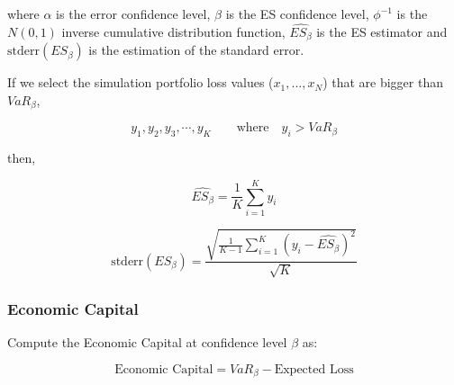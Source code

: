 \documentclass[a4paper,12pt,final]{article}
\begin{document}
where $\alpha$ is the error confidence level, $\beta$ is the ES confidence 
level, $\phi^{-1}$ is the $N(0,1)$ inverse cumulative distribution function, 
$\widehat{ES_{\beta}}$ is the ES estimator and $\textrm{stderr}(ES_{\beta})$
is the estimation of the standard error.
\newline

If we select the simulation portfolio loss values ($x_1, ..., x_N$) that are bigger 
than $VaR_{\beta}$,

\begin{displaymath}
y_1, y_2, y_3, \cdots, y_K \qquad \textrm{where} \quad y_i > VaR_{\beta}
\end{displaymath}

then,

\begin{displaymath}
\widehat{ES_{\beta}} = \frac{1}{K} \sum_{i=1}^{K} y_i
\end{displaymath}

\begin{displaymath}
\textrm{stderr}(ES_{\beta}) =
\frac{\sqrt{\frac{1}{K-1} \sum_{i=1}^{K} \left( y_i - \widehat{ES_{\beta}} \right)^2}}{\sqrt{K}}
\end{displaymath}

\subsubsection{Economic Capital}
Compute the Economic Capital at confidence level $\beta$ as:

\begin{displaymath}
\textrm{Economic Capital} = VaR_{\beta} - \textrm{Expected Loss}
\end{displaymath}

\end{document}
